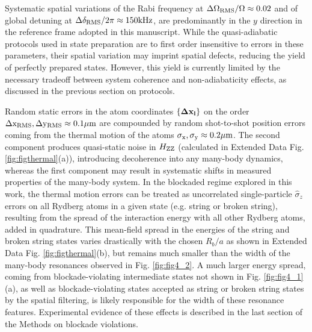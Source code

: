 \documentclass[footinbib,a4paper,aps,superscriptaddress,twocolumn,preprintnumbers,amsmath,amssymb,nobalancelastpage,10pt,prl]{revtex4-2}
\begin{document}
{Systematic spatial variations of the Rabi frequency at $\Delta\Omega_{\rm RMS}/\Omega \approx 0.02$ and of global detuning at $\Delta\delta_{\rm RMS}/2\pi \approx 150 {\rm kHz}$, are predominantly in the $y$ direction in the reference frame adopted in this manuscript. While the quasi-adiabatic protocols used in state preparation are to first order insensitive to errors in these parameters, their spatial variation may imprint spatial defects, reducing the yield of perfectly prepared states. However, this yield is currently limited by the necessary tradeoff between system coherence and non-adiabaticity effects, as discussed in the previous section on protocols.

Random static errors in the atom coordinates $\{{\bf \Delta x_l}\}$ on the order ${\rm \Delta x_{RMS},\Delta y_{RMS} \approx 0.1 \mu m}$ are compounded by random shot-to-shot position errors coming from the thermal motion of the atoms ${\rm \sigma_x, \sigma_y \approx 0.2 \mu m}$. The second component produces quasi-static noise in $H_{\rm ZZ}$ (calculated in Extended Data Fig. \ref{fig:figthermal}(a)), introducing decoherence into any many-body dynamics, whereas the first component may result in systematic shifts in measured properties of the many-body system. In the blockaded regime explored in this work, the thermal motion errors can be treated as uncorrelated single-particle $\hat{\sigma}_z$ errors on all Rydberg atoms in a given state (e.g. string or broken string), resulting from the spread of the interaction energy with all other Rydberg atoms, added in quadrature. This mean-field spread in the energies of the string and broken string states varies drastically with the chosen $R_b/a$ as shown in  Extended Data Fig. \ref{fig:figthermal}(b), but remains much smaller than the width of the many-body resonances observed in Fig. \ref{fig:fig4_2}. A much larger energy spread, coming from blockade-violating intermediate states not shown in Fig. \ref{fig:fig4_1}(a), as well as blockade-violating states accepted as string or broken string states by the spatial filtering, is likely responsible for the width of these resonance features. Experimental evidence of these effects is described in the last section of the Methods on blockade violations.

}
\end{document}

